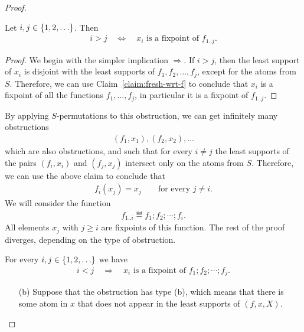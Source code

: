 \begin{proof}
\begin{claim}
    Let $i,j \in \{1,2,\ldots\}$. Then 
    \begin{align*}
    i > j
    \quad \Leftrightarrow \quad
    \text{$x_i$ is a fixpoint of } f_{1..j}.
    \end{align*}
\end{claim}
\begin{proof}
    We begin with the simpler implication $\Rightarrow$. If $i > j$, then the least support of $x_i$ is disjoint with the least supports of $f_1, f_2, \ldots, f_j$, except for the atoms from $S$. Therefore, we can use Claim~\ref{claim:fresh-wrt-f} to conclude that $x_i$ is a fixpoint of all  the functions $f_1,\ldots,f_j$, in particular it is a fixpoint of $f_{1..j}$.
\end{proof}
    By applying $S$-permutations to this obstruction, we can get infinitely many obstructions 
        \begin{align*}
        (f_1,x_1), (f_2,x_2),\ldots
        \end{align*}
    which are also obstructions, and such that for every $i \neq j$ the least supports of the pairs $(f_i,x_i)$ and $(f_j,x_j)$ intersect only on the atoms from $S$. Therefore, we can use the above claim to conclude that 
    \begin{align*}
    f_i(x_j) = x_j \qquad \text{for every } j \neq i.
    \end{align*}
    We will consider the function 
    \begin{align*}
    f_{1..i} \eqdef f_1 ; f_2 ; \cdots ; f_i.
    \end{align*}
    All elements $x_j$ with $j \geq i$ are fixpoints of this function. 
    The rest of the proof diverges, depending on the type of obstruction.

    \begin{claim}
        For every $i,j \in \{1,2,\ldots\}$ we have 
        \begin{align*}
        i  < j 
        \quad \Rightarrow \quad
        \text{$x_i$ is a fixpoint of } f_1; f_2; \cdots; f_j. 
        \end{align*}
    \end{claim}

    \begin{enumerate}[(a)]
        \item[(b)] Suppose that the obstruction has type (b), which means that there is some atom in $x$ that does not appear in the least supports of $(f,x,X)$. 
        

\end{enumerate}
\end{proof}
